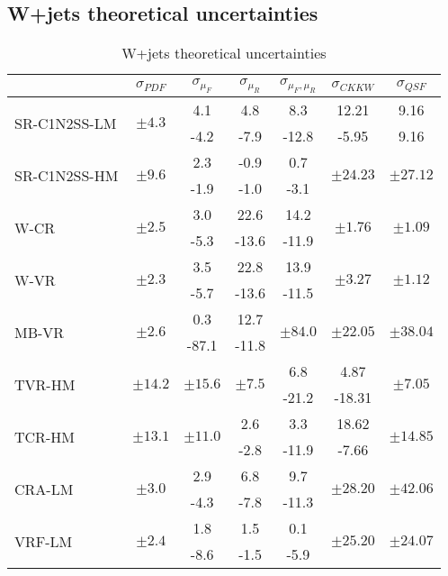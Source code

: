\subsection*{W+jets theoretical uncertainties}
\begin{table}[htpb!]
\centering
\begin{tabular}{|l|c|c|c|c|c|c|}
\hline 
 & $\sigma_{PDF}$ & $\sigma_{\mu_{F}}$ & $\sigma_{\mu_{R}}$ & $\sigma_{\mu_{F},\mu_{R}}$ & $\sigma_{CKKW}$ & $\sigma_{QSF}$\tabularnewline
\hline 
\multirow{2}{*}{SR-C1N2SS-LM} & \multirow{2}{*}{$\pm4.3$} & 4.1  & 4.8  & 8.3  & 12.21 & 9.16\tabularnewline
 &  & -4.2  & -7.9  & -12.8 & -5.95 & 9.16\tabularnewline
\hline 
\multirow{2}{*}{SR-C1N2SS-HM} & \multirow{2}{*}{$\pm9.6$ } & 2.3  & -0.9  & 0.7  & \multirow{2}{*}{$\pm24.23$} & \multirow{2}{*}{$\pm27.12$}\tabularnewline
 &  & -1.9  & -1.0  & -3.1 &  & \tabularnewline
\hline 
\multirow{2}{*}{W-CR} & \multirow{2}{*}{$\pm2.5$} & 3.0  & 22.6  & 14.2  & \multirow{2}{*}{$\pm1.76$} & \multirow{2}{*}{$\pm1.09$}\tabularnewline
 &  & -5.3  & -13.6  & -11.9 &  & \tabularnewline
\hline 
\multirow{2}{*}{W-VR} & \multirow{2}{*}{$\pm2.3$} & 3.5  & 22.8  & 13.9  & \multirow{2}{*}{$\pm3.27$} & \multirow{2}{*}{$\pm1.12$}\tabularnewline
 &  & -5.7  & -13.6  & -11.5 &  & \tabularnewline
\hline 
\multirow{2}{*}{MB-VR} & \multirow{2}{*}{$\pm2.6$} & 0.3  & 12.7  & \multirow{2}{*}{$\pm84.0$} & \multirow{2}{*}{$\pm22.05$} & \multirow{2}{*}{$\pm38.04$}\tabularnewline
 &  & -87.1  & -11.8  &  &  & \tabularnewline
\hline 
\multirow{2}{*}{TVR-HM} & \multirow{2}{*}{$\pm14.2$} & \multirow{2}{*}{$\pm15.6$} & \multirow{2}{*}{$\pm7.5$} & 6.8  & 4.87 & \multirow{2}{*}{$\pm7.05$}\tabularnewline
 &  &  &  & -21.2 & -18.31 & \tabularnewline
\hline 
\multirow{2}{*}{TCR-HM} & \multirow{2}{*}{$\pm13.1$} & \multirow{2}{*}{$\pm11.0$} & 2.6  & 3.3  & 18.62 & \multirow{2}{*}{$\pm14.85$}\tabularnewline
 &  &  & -2.8  & -11.9 & -7.66 & \tabularnewline
\hline 
\multirow{2}{*}{CRA-LM} & \multirow{2}{*}{$\pm3.0$} & 2.9  & 6.8  & 9.7  & \multirow{2}{*}{$\pm28.20$} & \multirow{2}{*}{$\pm42.06$}\tabularnewline
 &  & -4.3  & -7.8  & -11.3 &  & \tabularnewline
\hline 
\multirow{2}{*}{VRF-LM} & \multirow{2}{*}{$\pm2.4$} & 1.8  & 1.5  & 0.1  & \multirow{2}{*}{$\pm25.20$} & \multirow{2}{*}{$\pm24.07$}\tabularnewline
 &  & -8.6  & -1.5  & -5.9 &  & \tabularnewline
\hline 
\end{tabular}
\caption{W+jets theoretical uncertainties \label{tab:MB:SS:presel}}
\end{table}

